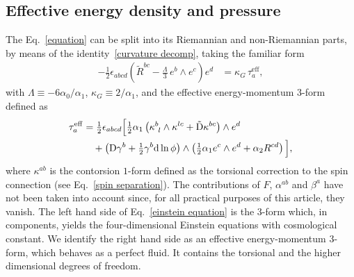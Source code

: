 \documentclass[aps,prd,12pt,superscriptaddress,showpacs,showkeys,longbibliography,reprint,nofootinbib]{revtex4-1}
\begin{document}
\subsection{Effective energy density and pressure}

The Eq.~\eqref{equation} can be split into its Riemannian and non-Riemannian parts, by means of the identity~\eqref{curvature decomp}, taking the familiar form
\begin{align}\label{einstein equation}
  -\frac{1}{2}\epsilon_{abcd}\left(\tilde{R}^{bc} - \frac{\Lambda}{3}\,e^b\wedge e^c\right)e^d &= \kappa_{G}\,\tau^{\mathrm{eff}}_a,
\end{align}
with $\Lambda \equiv -6\alpha_0/\alpha_1$, $\kappa_{G} \equiv 2/\alpha_1$, and the effective energy-momentum $3$-form defined as
\begin{align}
  \label{taua}
  \tau_a^{\mathrm{eff}}&= \tfrac{1}{2}\epsilon_{abcd}\Big[\tfrac{1}{2}\alpha_1\left(\kappa^b_{\ l}\wedge\kappa^{lc}+\tilde{\text{D}}\kappa^{bc}\right)\wedge e^d\\
    & \quad +\left(\text{D}\gamma^b+\tfrac{1}{2}\gamma^b\text{d}\ln\phi\right)\wedge\left(\tfrac{1}{2}\alpha_1e^c\wedge e^d+\alpha_2R^{cd}\right)\Big], \notag
\end{align}
where $\kappa^{ab}$ is the contorsion $1$-form defined as the torsional correction to the spin connection (see Eq.~\eqref{spin separation}).
The contributions of $F$, $\alpha^{ab}$ and $\beta^a$ have not been taken into account since, for all practical purposes of this article, they vanish.
The left hand side of Eq.~\eqref{einstein equation} is the 3-form which, in components, yields the four-dimensional Einstein equations with cosmological constant.
We identify the right hand side as an effective energy-momentum $3$-form, which behaves as a perfect fluid. It contains the torsional and the higher dimensional degrees of freedom.
\end{document}
